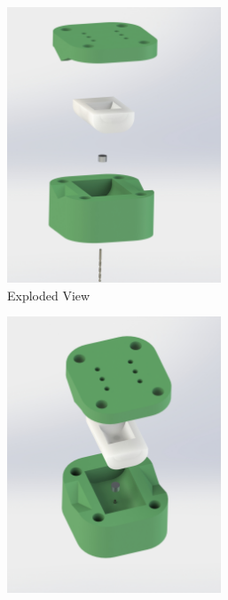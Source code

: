 \begin{figure}
    \centering
    \begin{subfigure}{.3\linewidth}
        \centering
    \includegraphics[width=0.7\textwidth]{Images/mold/exploded.png}
        \caption{Exploded View}
        \label{fig:exploded}
    \end{subfigure}
    \begin{subfigure}{.3\linewidth}
        \centering
\includegraphics[width=0.7\textwidth]{Images/mold/magnetoff.png}

\end{subfigure}
\end{figure}
